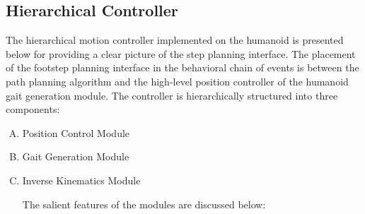 \documentclass[letterpaper, 10 pt, conference]{ieeeconf}  %
\begin{document}
\subsection{Hierarchical Controller}
The hierarchical motion controller implemented on the humanoid is presented below for providing a clear picture of the step planning interface. 
The placement of the footstep planning interface in the behavioral chain of
events is between the path planning algorithm and the high-level position
controller of the humanoid gait generation module. The
controller is hierarchically structured into three components:
	\begin{enumerate}[A)]
\item Position Control Module
\item Gait Generation Module
\item Inverse Kinematics Module

The salient features of the modules are discussed below:
\end{enumerate}
\end{document}
